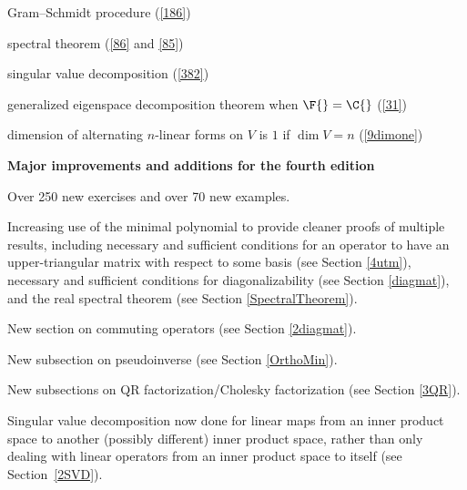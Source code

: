 {\begin{Itemize}

\item
Gram--Schmidt procedure (\ref{186})

\item
spectral theorem (\ref{86} and \ref{85})

\item
singular value decomposition (\ref{382})

\item
generalized eigenspace decomposition theorem when $\F{} = \C{}$ (\ref{31})

\item
dimension of alternating $n$-linear forms on $V$ is $1$ if $\dim V = n$ (\ref{9dimone})

\end{Itemize}

\pagebreak[3]

\textbf{Major improvements and additions for the fourth edition}

\begin{Itemize}

\item
Over 250 new exercises and over 70 new examples.

\item
Increasing use of the minimal polynomial to provide cleaner proofs of multiple results, including necessary and sufficient conditions for an operator to have an upper-triangular matrix with respect to some basis (see Section \ref{4utm}), necessary and sufficient conditions for diagonalizability (see Section \ref{diagmat}), and the real spectral theorem (see Section \ref{SpectralTheorem}).

\item
New section on commuting operators (see Section \ref{2diagmat}).

\item
New subsection on pseudoinverse (see Section \ref{OrthoMin}).

\item
New subsections on QR factorization/Cholesky factorization (see Section \ref{3QR}).

\item
Singular value decomposition now done for linear maps from an inner product space to another (possibly different) inner product space, rather than only dealing with linear operators from an inner product space to itself (see Section~\ref{2SVD}).


\end{Itemize}}
